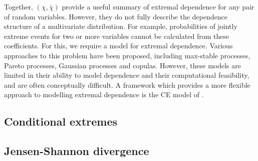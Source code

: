 \documentclass{article}
\numberwithin{equation}{section}
\begin{document}
Together, $(\chi, \bar{\chi})$ provide a useful summary of extremal dependence for any pair of random variables.
However, they do not fully describe the dependence structure of a multivariate distribution.
For example, probabilities of jointly extreme events for two or more variables cannot be calculated from these coefficients.
For this, we require a model for extremal dependence.
Various approaches to this problem have been proposed, including max-stable processes, Pareto processes, Gaussian processes and copulas.
However, these models are limited in their ability to model dependence and their computational feasibility, and are often conceptually difficult. 
A framework which provides a more flexible approach to modelling extremal dependence is the CE model of \citet{Heffernan2004}.

\subsection{Conditional extremes}


\subsection{Jensen-Shannon divergence}

\end{document}
